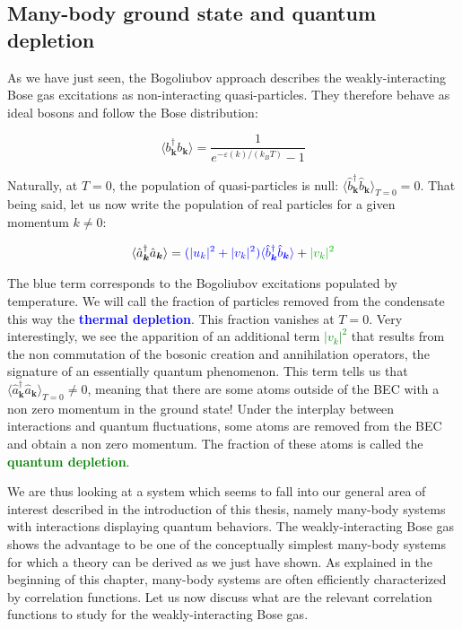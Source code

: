 \subsection{Many-body ground state and quantum depletion}

\label{sec:many_body_ground_state}

As we have just seen, the Bogoliubov approach describes the weakly-interacting Bose gas excitations as non-interacting quasi-particles. They therefore behave as ideal bosons and follow the Bose distribution:

\begin{equation}
    \langle b^{\dagger}_{\bm{k}}  b_{\bm{k}} \rangle=\frac{1}{e^{-\varepsilon(k)/(k_B T)}-1} 
    \label{eq:bose_qp}
\end{equation}

\noindent Naturally, at $T=0$, the population of quasi-particles is null: $\langle \hat{b}^{\dagger}_{\bm{k}}  \hat{b}_{\bm{k}} \rangle_{T=0}=0$. That being said, let us now write the population of real particles for a given momentum $k \neq 0$:

\begin{equation}
    \langle \hat{a}^{\dagger}_{\bm{k}}  \hat{a}_{\bm{k}} \rangle=\textcolor{blue}{(|u_k|^2+|v_k|^2)\langle \hat{b}^{\dagger}_{\bm{k}}  \hat{b}_{\bm{k}} \rangle} + \textcolor{green}{|v_k|^2}
\end{equation}

\noindent The blue term corresponds to the Bogoliubov excitations populated by temperature. We will call the fraction of particles removed from the condensate this way the \textcolor{blue}{\textbf{thermal depletion}}. This fraction vanishes at $T=0$. Very interestingly, we see the apparition of an additional term \textcolor{green}{$|v_k|^2$} that results from the non commutation of the bosonic creation and annihilation operators, the signature of an essentially quantum phenomenon. This term tells us that $\langle \hat{a}^{\dagger}_{\bm{k}}  \hat{a}_{\bm{k}} \rangle_{T=0} \neq 0$, meaning that there are some atoms outside of the BEC with a non zero momentum in the ground state! Under the interplay between interactions and quantum fluctuations, some atoms are removed from the BEC and obtain a non zero momentum. The fraction of these atoms is called the \textcolor{green}{\textbf{quantum depletion}}. 

We are thus looking at a system which seems to fall into our general area of interest described in the introduction of this thesis, namely many-body systems with interactions displaying quantum behaviors. The weakly-interacting Bose gas shows the advantage to be one of the conceptually simplest many-body systems for which a theory can be derived as we just have shown. As explained in the beginning of this chapter, many-body systems are often efficiently characterized by correlation functions. Let us now discuss what are the relevant correlation functions to study for the weakly-interacting Bose gas.


